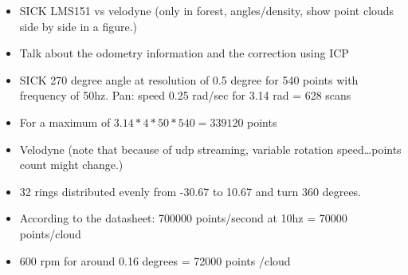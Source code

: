 \begin{figure}[H]
    \centering
    \caption{}
    \label{fig:slam_pointclouds}
\end{figure}

\begin{itemize}
    \item SICK LMS151 vs velodyne (only in forest, angles/density, show point clouds side by side in a figure.)
    \item Talk about the odometry information and the correction using ICP
    \item SICK 270 degree angle at resolution of 0.5 degree for 540 points with frequency of 50hz. Pan: speed 0.25 rad/sec for 3.14 rad = 628 scans
    \item For a maximum of $3.14*4*50*540=339120$ points
    \item Velodyne (note that because of udp streaming, variable rotation speed\dots points count might change.)
    \item 32 rings distributed evenly from -30.67 to 10.67 and turn 360 degrees.
    \item According to the datasheet: 700000 points/second at 10hz = 70000 points/cloud
    \item 600 rpm for around 0.16 degrees = 72000 points /cloud
\end{itemize}

